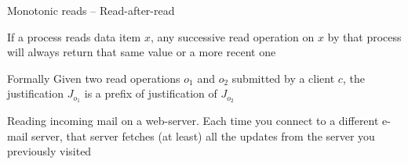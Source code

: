 
\begin{frame}{Monotonic reads -- Read-after-read}

\begin{definition}
If a process reads data item $x$, any successive read operation 
on $x$ by that process will always return that same value or a more recent one
\vspace{-12pt}
\begin{center}
\begin{minipage}{0.95\textwidth}
\begin{block}{Formally}
Given two read operations $o_1$ and $o_2$ submitted by a client $c$, the
justification $J_{o_1}$ is a prefix of justification of $J_{o_2}$
\end{block}
\end{minipage}
\end{center}
\end{definition}

\begin{example}
Reading incoming mail on a web-server. Each time you connect to a different 
e-mail server, that server fetches (at least) all the updates from the 
server you previously visited
\end{example}
% 

\end{frame}

